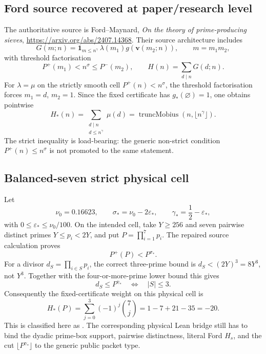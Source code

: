 \subsection{Ford source recovered at paper/research level}
The authoritative source is Ford--Maynard, \emph{On the theory of prime-producing sieves},
\url{https://arxiv.org/abs/2407.14368}.  Their source architecture includes
\[
G(m;n)=\mathbf 1_{m\le n^\gamma}\,\lambda(m_1)
        g\!\left(\mathbf v(m_2;n)\right),
\qquad
m=m_1m_2,
\]
with threshold factorisation
\[
P^+(m_1)<n^\sigma\le P^-(m_2),
\qquad
H(n)=\sum_{d\mid n}G(d;n).
\]
For $\lambda=\mu$ on the strictly smooth cell $P^+(n)<n^\sigma$, the threshold
factorisation forces $m_1=d$, $m_2=1$.  Since the fixed certificate has
$g_*(\varnothing)=1$, one obtains pointwise
\[
\boxed{
H_*(n)=\sum_{\substack{d\mid n\\ d\le n^\gamma}}\mu(d)
     =\operatorname{truncMobius}\!\left(n,\lfloor n^\gamma\rfloor\right)}.
\]
The strict inequality is load-bearing: the generic non-strict condition
$P^+(n)\le n^\sigma$ is not promoted to the same statement.

\subsection{Balanced-seven strict physical cell}
Let
\[
\nu_0=0.16623,\qquad
\sigma_*=\nu_0-2\varepsilon_*,\qquad
\gamma_*=\frac12-\varepsilon_*,
\]
with $0\le\varepsilon_*\le\nu_0/100$.  On the intended cell, take $Y\ge256$ and seven
pairwise distinct primes $Y\le p_i<2Y$, and put $P=\prod_{i=1}^7p_i$.  The repaired source
calculation proves
\[
P^+(P)<P^{\sigma_*}.
\]
For a divisor $d_S=\prod_{i\in S}p_i$, the correct three-prime bound is
$d_S<(2Y)^3=8Y^3$, not $Y^3$.  Together with the four-or-more-prime lower bound this gives
\[
 d_S\le P^{\gamma_*}\quad\Longleftrightarrow\quad |S|\le3.
\]
Consequently the fixed-certificate weight on this physical cell is
\[
\boxed{
H_*(P)=\sum_{j=0}^{3}(-1)^j\binom7j
      =1-7+21-35=-20.}
\]
This is classified here as .  The corresponding physical
Lean bridge still has to bind the dyadic prime-box support, pairwise distinctness, literal
Ford $H_s$, and the cut $\lfloor P^{\gamma_*}\rfloor$ to the generic public packet type.

